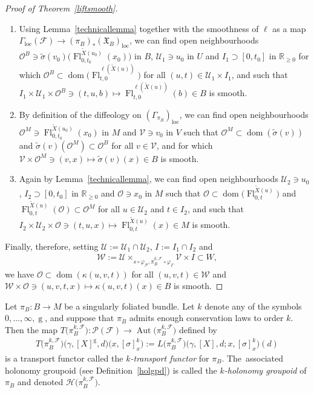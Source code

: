 \documentclass[pdftex]{sigma}
\numberwithin{equation}{section}
\def\loc{\operatorname{loc}}
\def\g{\operatorname{g}}
\def\dom{\operatorname{dom}}
\def\Aut{\operatorname{Aut}}
\def\Fl{\operatorname{Fl}}
\def\FF{{\mathcal{F}}}
\def\WW{{\mathcal{W}}}
\def\UU{{\mathcal{U}}}
\def\VV{{\mathcal{V}}}
\def\HH{{\mathcal{H}}}
\def\PP{{\mathcal{P}}}
\def\OO{{\mathcal{O}}}
\def\RB{{\mathbb{R}}}
\def\XF{{\mathfrak{X}}}
\begin{document}
\begin{proof}[Proof of Theorem~\ref{liftsmooth}]
\begin{enumerate}\itemsep=0pt
\item Using Lemma~\ref{technicallemma} together with the smoothness of $\ell$ as a map $\Gamma_{\loc}(\FF)\rightarrow(\pi_{B})_{*}(\XF_{B})_{\loc}$, we can find open neighbourhoods $\OO^{B}\ni\tilde{\sigma}(v_{0})\big(\Fl^{\tilde{X}(u_{0})}_{0,t_{0}}(x_{0})\big)$ in $B$, $\UU_{1}\ni u_{0}$ in $U$ and $I_{1}\supset[0,t_{0}]$ in $\RB_{\geq0}$ for which $\OO^{B}\subset\dom\big(\Fl^{\ell(\tilde{X}(u))}_{t,0}\big)$ for all $(u,t)\in\UU_{1}\times I_{1}$, and such that $I_{1}\times\UU_{1}\times \OO^{B}\ni(t,u,b)\mapsto\Fl^{\ell(\tilde{X}(u))}_{t,0}(b)\in B$ is smooth.
\item By definition of the diffeology on $(\Gamma_{\pi_{B}})_{\loc}$, we can find open neighbourhoods $\OO^{M}\ni\Fl^{\tilde{X}(u_{0})}_{0,t_{0}}(x_{0})$ in $M$ and $\VV\ni v_{0}$ in $V$ such that $\OO^{M}\subset\dom(\tilde{\sigma}(v))$ and $\tilde{\sigma}(v)(\OO^{M})\subset\OO^{B}$ for all $v\in\VV$, and for which $\VV\times\OO^{M}\ni(v,x)\mapsto\tilde{\sigma}(v)(x)\in B$ is smooth.
\item Again by Lemma~\ref{technicallemma}, we can find open neighbourhoods $\UU_{2}\ni u_{0}$, $I_{2}\supset[0,t_{0}]$ in $\RB_{\geq0}$ and $\OO\ni x_{0}$ in $M$ such that $\OO\subset\dom\big(\Fl^{\tilde{X}(u)}_{0,t}\big)$ and $\Fl^{\tilde{X}(u)}_{0,t}(\OO)\subset\OO^{M}$ for all $u\in\UU_{2}$ and $t\in I_{2}$, and such that $I_{2}\times\UU_{2}\times \OO\ni(t,u,x)\mapsto\Fl^{\tilde{X}(u)}_{0,t}(x)\in M$ is smooth.
\end{enumerate}
Finally, therefore, setting $\UU:=\UU_{1}\cap\UU_{2}$, $I:=I_{1}\cap I_{2}$ and
\begin{gather*}
\WW:=\UU\times_{s\circ\varphi_{\PP},\pi_{B}^{k,\FF}\circ\varphi_{\Gamma}}\VV\times I\subset W,
\end{gather*}
we have $\OO\subset\dom(\kappa(u,v,t))$ for all $(u,v,t)\in\WW$ and $\WW\times\OO\ni(u,v,t,x)\mapsto\kappa(u,v,t)(x)\in B$ is smooth.
\end{proof}

\begin{Definition}\label{transportfunctor}
Let $\pi_{B}\colon B\rightarrow M$ be a singularly foliated bundle. Let $k$ denote any of the symbols $0,\dots,\infty,\g$, and suppose that $\pi_{B}$ admits enough conservation laws to order $k$. Then the map $T\big(\pi_{B}^{k,\FF}\big)\colon \PP(\FF)\rightarrow\Aut\big(\pi_{B}^{k,\FF}\big)$ defined by
\begin{gather*}
T\big(\pi_{B}^{k,\FF}\big)\big(\gamma,[X]^{\g},d\big)\big(x,[\sigma]^{k}_{x}\big):= L\big(\pi_{B}^{k,\FF}\big)\big(\gamma,[X],d;x,[\sigma]^{k}_{x}\big)(d)
\end{gather*}
is a transport functor called the \textit{$k$-transport functor} for $\pi_{B}$. The~associated holonomy groupoid (see Definition~\ref{holgpd}) is called the \textit{$k$-holonomy groupoid} of $\pi_{B}$ and denoted $\HH\big(\pi_{B}^{k,\FF}\big)$.
\end{Definition}
\end{document}
